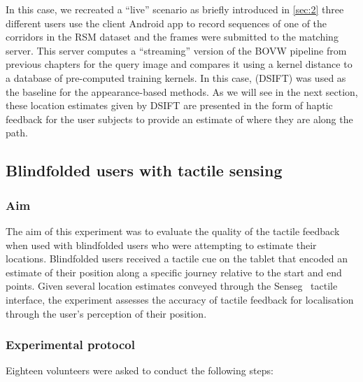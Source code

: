 In this case, we recreated a ``live'' scenario as briefly introduced in \ref{sec:2} three different users use the client Android app to record sequences of one of the corridors in the RSM dataset and the frames were submitted to the matching server. This server computes a ``streaming'' version of the BOVW pipeline from previous chapters for the query image and compares it using a kernel distance to a database of pre-computed training kernels. In this case, (DSIFT) was used as the baseline for the appearance-based methods. As we will see in the next section, these location estimates given by DSIFT are presented in the form of haptic feedback for the user subjects to provide an estimate of where they are along the path.


\subsection{Blindfolded users with tactile sensing}
\label{subsec:tactile_feedback}
\subsubsection{Aim}
The aim of this experiment was to evaluate the quality of the tactile feedback when used with blindfolded users who were attempting to estimate their locations. Blindfolded users received a tactile cue on the tablet that encoded an estimate of their position along a specific journey relative to the start and end points. Given several location estimates conveyed through the Senseg\texttrademark~ tactile interface, the experiment assesses the accuracy of tactile feedback for localisation through the user's perception of their position.

\subsubsection{Experimental protocol}
Eighteen volunteers were asked to conduct the following steps:

